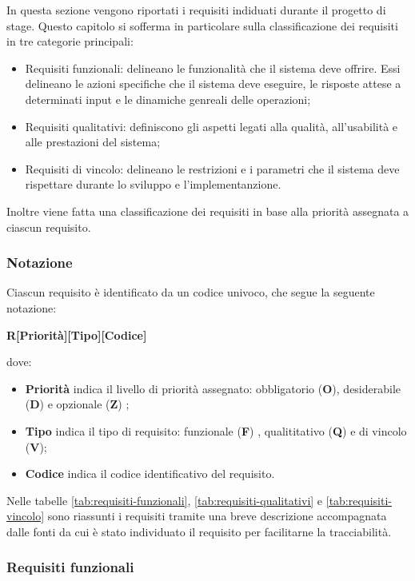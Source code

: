 In questa sezione vengono riportati i requisiti indiduati durante il progetto di stage.
Questo capitolo si sofferma in particolare sulla classificazione dei requisiti in tre categorie principali:
\begin{itemize}
    \item Requisiti funzionali: delineano le funzionalità che il sistema deve offrire. Essi delineano le azioni specifiche che il sistema deve eseguire, le risposte attese a determinati input e le dinamiche genreali delle operazioni;
    \item Requisiti qualitativi: definiscono gli aspetti legati alla qualità, all'usabilità e alle prestazioni del sistema;
    \item Requisiti di vincolo: delineano le restrizioni e i parametri che il sistema deve rispettare durante lo sviluppo e l'implementanzione. 
\end{itemize}

Inoltre viene fatta una classificazione dei requisiti in base alla priorità assegnata a ciascun requisito.

\subsubsection{Notazione}
Ciascun requisito è identificato da un codice univoco, che segue la seguente notazione:
\begin{center}
    \textbf{R[Priorità][Tipo][Codice]}
\end{center}
  dove:
  \begin{itemize}
  \item \textbf{Priorità} indica il livello di priorità assegnato: obbligatorio (\textbf{O}), desiderabile (\textbf{D}) e opzionale (\textbf{Z}) ;
  \item \textbf{Tipo} indica il tipo di requisito: funzionale (\textbf{F}) , qualititativo (\textbf{Q}) e di vincolo (\textbf{V});
  \item \textbf{Codice} indica il codice identificativo del requisito.
  \end{itemize}

Nelle tabelle \ref{tab:requisiti-funzionali}, \ref{tab:requisiti-qualitativi} e \ref{tab:requisiti-vincolo} sono riassunti i requisiti tramite una breve descrizione accompagnata dalle fonti da cui è stato individuato il requisito per
facilitarne la tracciabilità. 


\subsubsection{Requisiti funzionali}

